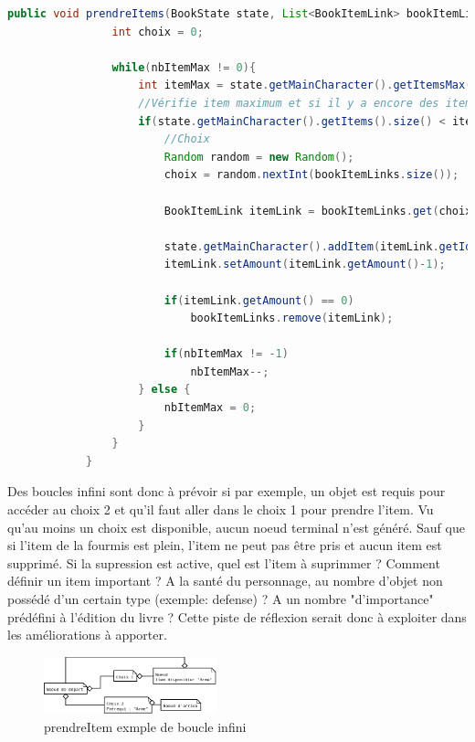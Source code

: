 		\begin{lstlisting}[gobble=12, language=java, caption=prendreItems() de Fourmis]
			public void prendreItems(BookState state, List<BookItemLink> bookItemLinks, int nbItemMax){
				int choix = 0;

				while(nbItemMax != 0){
					int itemMax = state.getMainCharacter().getItemsMax();
					//Vérifie item maximum et si il y a encore des items à prendre
					if(state.getMainCharacter().getItems().size() < itemMax && !bookItemLinks.isEmpty()){
						//Choix
						Random random = new Random();
						choix = random.nextInt(bookItemLinks.size());

						BookItemLink itemLink = bookItemLinks.get(choix);

						state.getMainCharacter().addItem(itemLink.getId());
						itemLink.setAmount(itemLink.getAmount()-1);

						if(itemLink.getAmount() == 0)
							bookItemLinks.remove(itemLink);

						if(nbItemMax != -1)
							nbItemMax--;
					} else {
						nbItemMax = 0;
					}
				}
			}
		\end{lstlisting}

		Des boucles infini sont donc à prévoir si par exemple, un objet est requis pour accéder au choix 2 et qu'il faut aller dans le choix 1 pour prendre l'item. Vu qu'au moins un choix est disponible, aucun noeud terminal n'est généré. Sauf que si l'item de la fourmis est plein, l'item ne peut pas être pris et aucun item est supprimé. Si la supression est active, quel est l'item à suprimmer ? Comment définir un item important ? A la santé du personnage, au nombre d'objet non possédé d'un certain type (exemple: defense) ? A un nombre "d'importance" prédéfini à l'édition du livre ? Cette piste de réflexion serait donc à exploiter dans les améliorations à apporter.

		\begin{figure}
			\centering\includegraphics[width=5cm]{img/fourmisPrendreItemInfiniExemple.png}
			\caption{prendreItem exmple de boucle infini}
		\end{figure}

